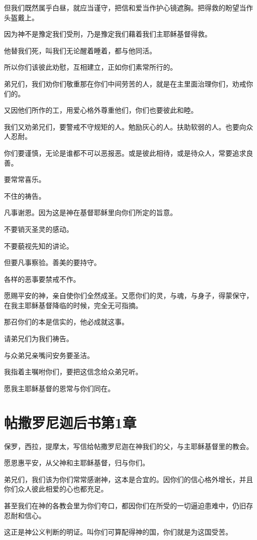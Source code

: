 \documentclass[12pt,oneside]{book}
\begin{document}
但我们既然属乎白昼，就应当谨守，把信和爱当作护心镜遮胸。把得救的盼望当作头盔戴上。

因为神不是豫定我们受刑，乃是豫定我们藉着我们主耶稣基督得救。

他替我们死，叫我们无论醒着睡着，都与他同活。

所以你们该彼此劝慰，互相建立，正如你们素常所行的。

弟兄们，我们劝你们敬重那在你们中间劳苦的人，就是在主里面治理你们，劝戒你们的。

又因他们所作的工，用爱心格外尊重他们，你们也要彼此和睦。

我们又劝弟兄们，要警戒不守规矩的人。勉励灰心的人。扶助软弱的人。也要向众人忍耐。

你们要谨慎，无论是谁都不可以恶报恶。或是彼此相待，或是待众人，常要追求良善。

要常常喜乐。

不住的祷告。

凡事谢恩。因为这是神在基督耶稣里向你们所定的旨意。

不要销灭圣灵的感动。

不要藐视先知的讲论。

但要凡事察验。善美的要持守。

各样的恶事要禁戒不作。

愿赐平安的神，亲自使你们全然成圣。又愿你们的灵，与魂，与身子，得蒙保守，在我主耶稣基督降临的时候，完全无可指摘。

那召你们的本是信实的，他必成就这事。

请弟兄们为我们祷告。

与众弟兄亲嘴问安务要圣洁。

我指着主嘱咐你们，要把这信念给众弟兄听。

愿我主耶稣基督的恩常与你们同在。

\chapter{帖撒罗尼迦后书第1章}
保罗，西拉，提摩太，写信给帖撒罗尼迦在神我们的父，与主耶稣基督里的教会。

愿恩惠平安，从父神和主耶稣基督，归与你们。

弟兄们，我们该为你们常常感谢神，这本是合宜的。因你们的信心格外增长，并且你们众人彼此相爱的心也都充足。

甚至我们在神的各教会里为你们夸口，都因你们在所受的一切逼迫患难中，仍旧存忍耐和信心。

这正是神公义判断的明证。叫你们可算配得神的国，你们就是为这国受苦。
\end{document}
